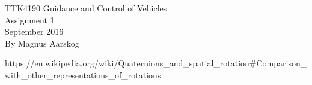 \documentclass[12pt,a4paper]{article}	  %
\begin{document}
\begin{titlepage}
\begin{center}
\Large TTK4190 Guidance and Control of Vehicles \\
\vspace{10pt}
\Large Assignment 1 \\
\vspace{10pt}
\large September 2016 \\By Magnus Aarskog
\end{center}
\end{titlepage}




 
 https://en.wikipedia.org/wiki/Quaternions_and_spatial_rotation#Comparison_with_other_representations_of_rotations
 


\end{document}
